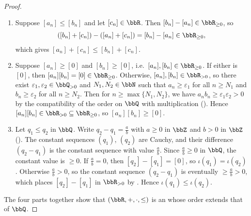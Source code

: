 \begin{proof}
\begin{enumerate}
        \item Suppose $[a_n] \le [b_n]$ and let $[c_n] \in \bbR$. Then $[b_n] - [a_n] \in \bbR_{\ge 0}$, so
        $$([b_n] + [c_n]) - ([a_n] + [c_n]) = [b_n] - [a_n] \in \bbR_{\ge 0},$$
        which gives $[a_n] + [c_n] \le [b_n] + [c_n]$.

        \item Suppose $[a_n] \ge [0]$ and $[b_n] \ge [0]$, i.e.\ $[a_n], [b_n] \in \bbR_{\ge 0}$. If either is $[0]$, then $[a_n][b_n] = [0] \in \bbR_{\ge 0}$. Otherwise, $[a_n], [b_n] \in \bbR_{>0}$, so there exist $\varepsilon_1, \varepsilon_2 \in \bbQ_{>0}$ and $N_1, N_2 \in \bbN$ such that $a_n \ge \varepsilon_1$ for all $n \ge N_1$ and $b_n \ge \varepsilon_2$ for all $n \ge N_2$. Then for $n \ge \max\{N_1, N_2\}$, we have $a_n b_n \ge \varepsilon_1 \varepsilon_2 > 0$ by the compatibility of the order on $\bbQ$ with multiplication (). Hence $[a_n][b_n] \in \bbR_{>0} \subseteq \bbR_{\ge 0}$, so $[a_n][b_n] \ge [0]$.

        \item Let $q_1 \le q_2$ in $\bbQ$. Write $q_2 - q_1 = \frac{a}{b}$ with $a \ge 0$ in $\bbZ$ and $b > 0$ in $\bbZ$ (). The constant sequences $(q_1)$, $(q_2)$ are Cauchy, and their difference $(q_2 - q_1)$ is the constant sequence with value $\frac{a}{b}$. Since $\frac{a}{b} \ge 0$ in $\bbQ$, the constant value is $\ge 0$. If $\frac{a}{b} = 0$, then $[q_2] - [q_1] = [0]$, so $\iota(q_1) = \iota(q_2)$. Otherwise $\frac{a}{b} > 0$, so the constant sequence $(q_2 - q_1)$ is eventually $\ge \frac{a}{b} > 0$, which places $[q_2] - [q_1]$ in $\bbR_{>0}$ by . Hence $\iota(q_1) \le \iota(q_2)$.
    \end{enumerate}

    The four parts together show that $(\bbR, +, \cdot, \le)$ is an  whose order extends that of $\bbQ$.
\end{proof}